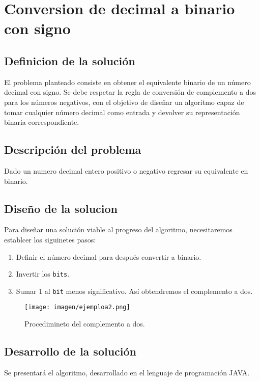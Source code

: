 
\section{Conversion de decimal a binario con signo}

\subsection{Definicion de la solución}

El problema planteado consiste en obtener el equivalente binario de un número decimal con signo. Se debe respetar la regla de conversión de complemento a dos para los números negativos, con el objetivo de diseñar un algoritmo capaz de tomar cualquier número decimal como entrada y devolver su representación binaria correspondiente.\cite{Decimal a  binario con signo}
\subsection{Descripción del problema}
Dado un numero decimal entero positivo o negativo regresar su equivalente en binario.

\subsection{Diseño de la solucion}
Para diseñar una solución viable al progreso del algoritmo, necesitaremos establcer los siguinetes pasos:

\begin{enumerate}

\item Definir el número decimal para después convertir a binario.

\item Invertir los \texttt{bits}.

\item Sumar 1 al \texttt{bit} menos significativo. Así obtendremos el complemento a dos.
\end{enumerate}

 \begin {figure}[h!]
\centerline{\texttt{[image: imagen/ejemploa2.png]}}
\caption{Procedimineto del complemento a dos.}
\label{fig}
\end {figure}

\subsection{Desarrollo de la solución}
Se presentará el algoritmo, desarrollado en el lenguaje de programación JAVA.

